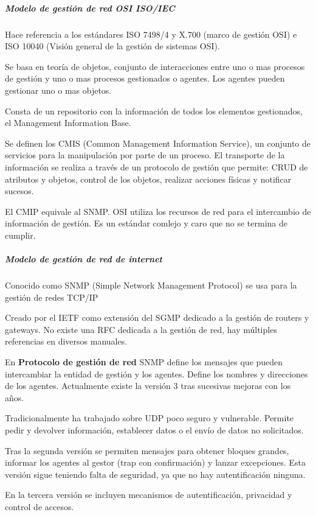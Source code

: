             \subparagraph{Modelo de gestión de red OSI ISO/IEC} %
                Hace referencia a los estándares ISO 7498/4 y X.700 (marco de gestión OSI) e ISO 10040 (Visión general de la gestión de sistemas OSI).

                Se basa en teoría de objetos, conjunto de interacciones entre uno o mas procesos de gestión y uno o mas procesos gestionados o agentes. Los agentes pueden gestionar uno o mas objetos.

                Consta de un repositorio con la información de todos los elementos gestionados, el Management Information Base.

                Se definen los CMIS (Common Management Information Service), un conjunto de servicios para la manipulación por parte de un proceso. El transporte de la información se realiza a través de un protocolo de gestión que permite: CRUD de atributos y objetos, control de los objetos, realizar acciones físicas y notificar sucesos.

                El CMIP equivale al SNMP. OSI utiliza los recursos de red para el intercambio de información de gestión. Es un estándar comlejo y caro que no se termina de cumplir.

            \subparagraph{Modelo de gestión de red de internet} %
                Conocido como SNMP (Simple Network Management Protocol) se usa para la gestión de redes TCP/IP

                Creado por el IETF como extensión del SGMP dedicado a la gestión de routers y gateways. No existe una RFC dedicada a la gestión de red, hay múltiples referencias en diversos manuales.

                En \textbf{Protocolo de gestión de red} SNMP define los mensajes que pueden intercambiar la entidad de gestión y los agentes. Define los nombres y direcciones de los agentes. Actualmente existe la versión 3 tras sucesivas mejoras con los años.

                Tradicionalmente ha trabajado sobre UDP poco seguro y vulnerable. Permite pedir y devolver información, establecer datos o el envío de datos no solicitados.

                Tras la segunda versión se permiten mensajes para obtener bloques grandes, informar los agentes al gestor (trap con confirmación) y lanzar excepciones. Esta versión sigue teniendo falta de seguridad, ya que no hay autentificación ninguna.

                En la tercera versión se incluyen mecanismos de autentificación, privacidad y control de accesos.

